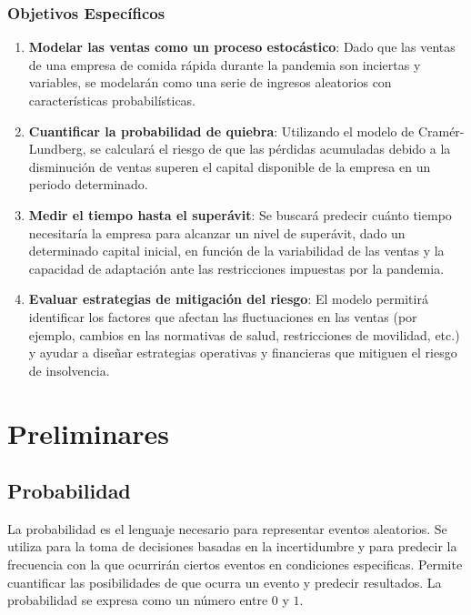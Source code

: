 \documentclass[
  us-letterpaper,
]{scrreprt}
\theoremstyle{plain}
\theoremstyle{plain}
\theoremstyle{definition}
\theoremstyle{remark}
\begin{document}
\section*{Objetivos Específicos}\label{objetivos-especuxedficos}


\begin{enumerate}
\def\labelenumi{\arabic{enumi}.}
\item
  \textbf{Modelar las ventas como un proceso estocástico}: Dado que las
  ventas de una empresa de comida rápida durante la pandemia son
  inciertas y variables, se modelarán como una serie de ingresos
  aleatorios con características probabilísticas.
\item
  \textbf{Cuantificar la probabilidad de quiebra}: Utilizando el modelo
  de Cramér-Lundberg, se calculará el riesgo de que las pérdidas
  acumuladas debido a la disminución de ventas superen el capital
  disponible de la empresa en un periodo determinado.
\item
  \textbf{Medir el tiempo hasta el superávit}: Se buscará predecir
  cuánto tiempo necesitaría la empresa para alcanzar un nivel de
  superávit, dado un determinado capital inicial, en función de la
  variabilidad de las ventas y la capacidad de adaptación ante las
  restricciones impuestas por la pandemia.
\item
  \textbf{Evaluar estrategias de mitigación del riesgo}: El modelo
  permitirá identificar los factores que afectan las fluctuaciones en
  las ventas (por ejemplo, cambios en las normativas de salud,
  restricciones de movilidad, etc.) y ayudar a diseñar estrategias
  operativas y financieras que mitiguen el riesgo de insolvencia.
\end{enumerate}

\part{Preliminares}

\chapter{Probabilidad}\label{probabilidad}

La probabilidad es el lenguaje necesario para representar eventos
aleatorios. Se utiliza para la toma de decisiones basadas en la
incertidumbre y para predecir la frecuencia con la que ocurrirán ciertos
eventos en condiciones especificas. Permite cuantificar las
posibilidades de que ocurra un evento y predecir resultados. La
probabilidad se expresa como un número entre \(0\) y \(1\).
\end{document}
